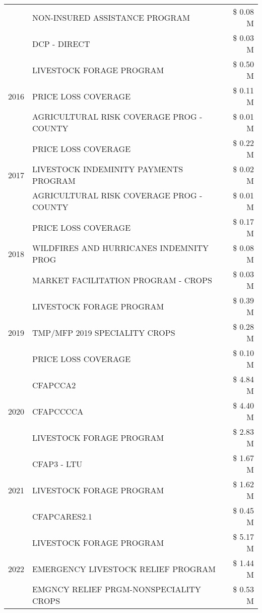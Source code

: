 \begin{tabular}{llr}
 & NON-INSURED ASSISTANCE PROGRAM & \$ 0.08 M \\
 & DCP - DIRECT & \$ 0.03 M \\
\cline{1-3}
\multirow[t]{3}{*}{2016} & LIVESTOCK FORAGE PROGRAM & \$ 0.50 M \\
 & PRICE LOSS COVERAGE & \$ 0.11 M \\
 & AGRICULTURAL RISK COVERAGE PROG - COUNTY & \$ 0.01 M \\
\cline{1-3}
\multirow[t]{3}{*}{2017} & PRICE LOSS COVERAGE & \$ 0.22 M \\
 & LIVESTOCK INDEMINITY PAYMENTS PROGRAM & \$ 0.02 M \\
 & AGRICULTURAL RISK COVERAGE PROG - COUNTY & \$ 0.01 M \\
\cline{1-3}
\multirow[t]{3}{*}{2018} & PRICE LOSS COVERAGE & \$ 0.17 M \\
 & WILDFIRES AND HURRICANES INDEMNITY PROG & \$ 0.08 M \\
 & MARKET FACILITATION PROGRAM - CROPS & \$ 0.03 M \\
\cline{1-3}
\multirow[t]{3}{*}{2019} & LIVESTOCK FORAGE PROGRAM & \$ 0.39 M \\
 & TMP/MFP 2019 SPECIALITY CROPS & \$ 0.28 M \\
 & PRICE LOSS COVERAGE & \$ 0.10 M \\
\cline{1-3}
\multirow[t]{3}{*}{2020} & CFAPCCA2 & \$ 4.84 M \\
 & CFAPCCCCA & \$ 4.40 M \\
 & LIVESTOCK FORAGE PROGRAM & \$ 2.83 M \\
\cline{1-3}
\multirow[t]{3}{*}{2021} & CFAP3 - LTU & \$ 1.67 M \\
 & LIVESTOCK FORAGE PROGRAM & \$ 1.62 M \\
 & CFAPCARES2.1 & \$ 0.45 M \\
\cline{1-3}
\multirow[t]{3}{*}{2022} & LIVESTOCK FORAGE PROGRAM & \$ 5.17 M \\
 & EMERGENCY LIVESTOCK RELIEF PROGRAM & \$ 1.44 M \\
 & EMGNCY RELIEF PRGM-NONSPECIALITY CROPS & \$ 0.53 M \\
\cline{1-3}
\bottomrule
\end{tabular}
